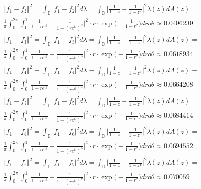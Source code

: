 \documentclass[12pt]{article}
\begin{document}
\begin{align}
&\Vert f_1 - f_2\Vert^2 = \int_\mathbb{D} \vert f_1 - f_2 \vert^2 d\lambda = \int_\mathbb{D} \bigg\vert \frac{1}{1-z} - \frac{1}{1-z^2} \bigg\vert^2 \lambda(z) dA(z) = \\
&\frac{1}{\pi} \int_0^{2\pi} \int_0^1 \bigg\vert \frac{1}{1-re^{i\theta}} - \frac{1}{1-(re^{i\theta})^2} \bigg\vert^2 \cdot r \cdot \exp\bigg(-\frac{1}{1-r^2}\bigg) dr d\theta \approx 0.0496239 \\
&\Vert f_1 - f_3\Vert^2 = \int_\mathbb{D} \vert f_1 - f_3 \vert^2 d\lambda = \int_\mathbb{D} \bigg\vert \frac{1}{1-z} - \frac{1}{1-z^3} \bigg\vert^2 \lambda(z) dA(z) = \\
&\frac{1}{\pi} \int_0^{2\pi} \int_0^1 \bigg\vert \frac{1}{1-re^{i\theta}} - \frac{1}{1-(re^{i\theta})^3} \bigg\vert^2 \cdot r \cdot \exp\bigg(-\frac{1}{1-r^2}\bigg) dr d\theta \approx 0.0618934 \\
&\Vert f_1 - f_4\Vert^2 = \int_\mathbb{D} \vert f_1 - f_4 \vert^2 d\lambda = \int_\mathbb{D} \bigg\vert \frac{1}{1-z} - \frac{1}{1-z^4} \bigg\vert^2 \lambda(z) dA(z) = \\
&\frac{1}{\pi} \int_0^{2\pi} \int_0^1 \bigg\vert \frac{1}{1-re^{i\theta}} - \frac{1}{1-(re^{i\theta})^4} \bigg\vert^2 \cdot r \cdot \exp\bigg(-\frac{1}{1-r^2}\bigg) dr d\theta \approx 0.0664208 \\
&\Vert f_1 - f_5\Vert^2 = \int_\mathbb{D} \vert f_1 - f_5 \vert^2 d\lambda = \int_\mathbb{D} \bigg\vert \frac{1}{1-z} - \frac{1}{1-z^5} \bigg\vert^2 \lambda(z) dA(z) =\\
&\frac{1}{\pi} \int_0^{2\pi} \int_0^1 \bigg\vert \frac{1}{1-re^{i\theta}} - \frac{1}{1-(re^{i\theta})^5} \bigg\vert^2 \cdot r \cdot \exp\bigg(-\frac{1}{1-r^2}\bigg) dr d\theta \approx 0.0684414 \\
&\Vert f_1 - f_6\Vert^2 = \int_\mathbb{D} \vert f_1 - f_6 \vert^2 d\lambda = \int_\mathbb{D} \bigg\vert \frac{1}{1-z} - \frac{1}{1-z^6} \bigg\vert^2 \lambda(z) dA(z) =\\
&\frac{1}{\pi} \int_0^{2\pi} \int_0^1 \bigg\vert \frac{1}{1-re^{i\theta}} - \frac{1}{1-(re^{i\theta})^6} \bigg\vert^2 \cdot r \cdot \exp\bigg(-\frac{1}{1-r^2}\bigg) dr d\theta \approx 0.0694552 \\
&\Vert f_1 - f_7\Vert^2 = \int_\mathbb{D} \vert f_1 - f_7 \vert^2 d\lambda = \int_\mathbb{D} \bigg\vert \frac{1}{1-z} - \frac{1}{1-z^7} \bigg\vert^2 \lambda(z) dA(z) =\\
&\frac{1}{\pi} \int_0^{2\pi} \int_0^1 \bigg\vert \frac{1}{1-re^{i\theta}} - \frac{1}{1-(re^{i\theta})^7} \bigg\vert^2 \cdot r \cdot \exp\bigg(-\frac{1}{1-r^2}\bigg) dr d\theta \approx 0.070059 \\

\end{align}
\end{document}
